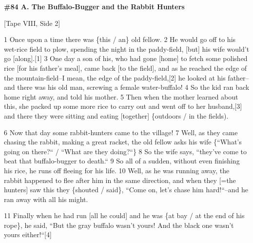 
\textbf{\#84 A. The Buffalo-Bugger and the Rabbit Hunters}

[Tape VIII, Side 2]

1 Once upon a time there was \{this / an\} old fellow. 2 He would go off to his
wet-rice field to plow, spending the night in the paddy-field, [but] his wife would't
go [along].[1] 3 One day a son of his, who had gone [home] to fetch some polished
rice [for his father's meal], came back [to the field], and as he reached the edge
of the mountain-field--I mean, the edge of the paddy-field,[2] he looked at his
father--and there was his old man, screwing a female water-buffalo! 4 So the kid
ran back home right away, and told his mother. 5 Then when the mother learned about
this, she packed up some more rice to carry out and went off to her husband,[3]
and there they were sitting and eating [together] \{outdoors / in the fields).

6 Now that day some rabbit-hunters came to the village! 7 Well, as they came chasing
the rabbit, making a great racket, the old fellow asks his wife \{``What's
going on there?`` / ``What are they doing?``\} 8 So the
wife says, ``they've come to beat that buffalo-bugger to death.``
9 So all of a sudden, without even finishing his rice, he runs off fleeing for
his life. 10 Well, as he was running away, the rabbit happened to flee after him
in the same direction, and when they [=the hunters] saw this they \{shouted / said\},
``Come on, let's chase him hard!``--and he ran away with all his
might.

11 Finally when he had run [all he could] and he was \{at bay / at the end of his
rope\}, he said, ``But the gray buffalo wasn't yours! And the black one
wasn't yours either!``[4]

